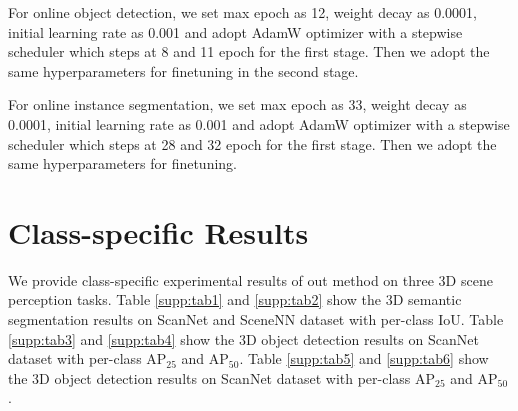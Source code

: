 For online object detection, we set max epoch as 12, weight decay as 0.0001, initial learning rate as 0.001 and adopt AdamW optimizer with a stepwise scheduler which steps at 8 and 11 epoch for the first stage. Then we adopt the same hyperparameters for finetuning in the second stage.

For online instance segmentation, we set max epoch as 33, weight decay as 0.0001, initial learning rate as 0.001 and adopt AdamW optimizer with a stepwise scheduler which steps at 28 and 32 epoch for the first stage. Then we adopt the same hyperparameters for finetuning.


\section{Class-specific Results}\label{category}
We provide class-specific experimental results of out method on three 3D scene perception tasks. Table \ref{supp:tab1} and \ref{supp:tab2} show the 3D semantic segmentation results on ScanNet and SceneNN dataset with per-class IoU. 
Table \ref{supp:tab3} and \ref{supp:tab4} show the 3D object detection results on ScanNet dataset with per-class AP$_{25}$ and AP$_{50}$.
Table \ref{supp:tab5} and \ref{supp:tab6} show the 3D object detection results on ScanNet dataset with per-class AP$_{25}$ and AP$_{50}$.

\newpage

\begin{table}[tp]
	\centering
	\caption{Per-class 3D semantic segmentation results (IoU) of our method on the ScanNet validation set.}
        \vspace{-6pt}
	\label{supp:tab1}\vspace{-8pt}
\end{table} 

